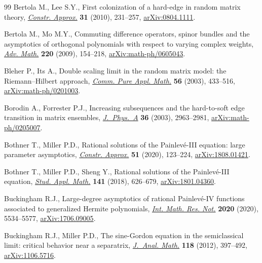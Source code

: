 \begin{thebibliography}{99}
Bertola M., Lee S.Y., First colonization of a hard-edge in random matrix
 theory, \href{https://doi.org/10.1007/s00365-009-9052-4}{\textit{Constr.
 Approx.}} \textbf{31} (2010), 231--257,
 \href{http://arxiv.org/abs/0804.1111}{arXiv:0804.1111}.

Bertola M., Mo M.Y., Commuting difference operators, spinor bundles and the
 asymptotics of orthogonal polynomials with respect to varying complex
 weights, \href{https://doi.org/10.1016/j.aim.2008.09.001}{\textit{Adv.
 Math.}} \textbf{220} (2009), 154--218,
 \href{http://arxiv.org/abs/math-ph/0605043}{arXiv:math-ph/0605043}.

Bleher P., Its A., Double scaling limit in the random matrix model: the
 {R}iemann--{H}ilbert approach,
 \href{https://doi.org/10.1002/cpa.10065}{\textit{Comm. Pure Appl. Math.}}
 \textbf{56} (2003), 433--516,
 \href{http://arxiv.org/abs/math-ph/0201003}{arXiv:math-ph/0201003}.

Borodin A., Forrester P.J., Increasing subsequences and the hard-to-soft edge
 transition in matrix ensembles,
 \href{https://doi.org/10.1088/0305-4470/36/12/307}{\textit{J.~Phys.~A}}
 \textbf{36} (2003), 2963--2981,
 \href{http://arxiv.org/abs/math-ph/0205007}{arXiv:math-ph/0205007}.

Bothner T., Miller P.D., Rational solutions of the {P}ainlev\'e-{III} equation:
 large parameter asymptotics,
 \href{https://doi.org/10.1007/s00365-019-09463-4}{\textit{Constr. Approx.}}
 \textbf{51} (2020), 123--224,
 \href{http://arxiv.org/abs/1808.01421}{arXiv:1808.01421}.

Bothner T., Miller P.D., Sheng Y., Rational solutions of the {P}ainlev\'e-{III}
 equation, \href{https://doi.org/10.1111/sapm.12220}{\textit{Stud. Appl.
 Math.}} \textbf{141} (2018), 626--679,
 \href{http://arxiv.org/abs/1801.04360}{arXiv:1801.04360}.

Buckingham R.J., Large-degree asymptotics of rational {P}ainlev\'e-{IV}
 functions associated to generalized {H}ermite polynomials,
 \href{https://doi.org/10.1093/imrn/rny172}{\textit{Int. Math. Res. Not.}}
 \textbf{2020} (2020), 5534--5577,
 \href{http://arxiv.org/abs/1706.09005}{arXiv:1706.09005}.

Buckingham R.J., Miller P.D., The sine-{G}ordon equation in the semiclassical
 limit: critical behavior near a separatrix,
 \href{https://doi.org/10.1007/s11854-012-0041-3}{\textit{J.~Anal. Math.}}
 \textbf{118} (2012), 397--492,
 \href{http://arxiv.org/abs/1106.5716}{arXiv:1106.5716}.


\end{thebibliography}
